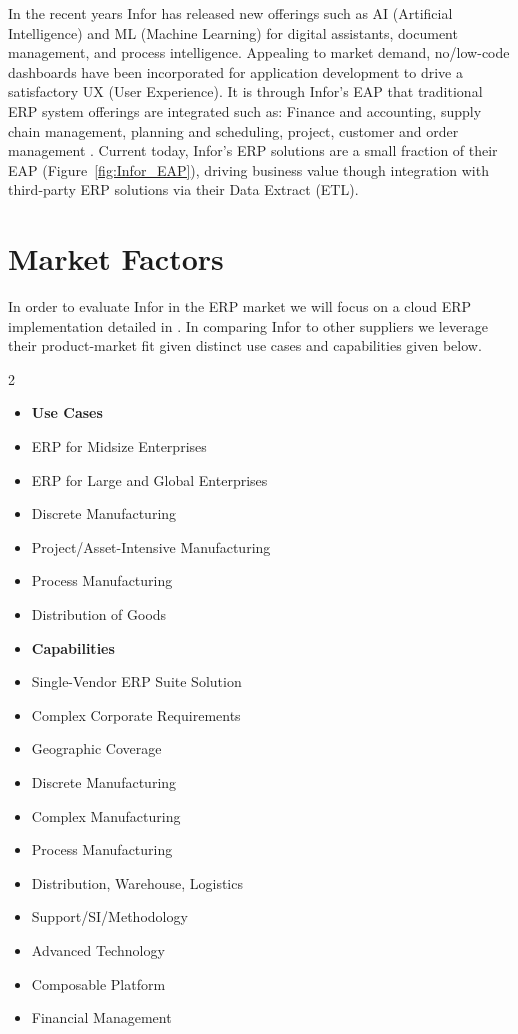 \documentclass{article}
\begin{document}
In the recent years Infor has released new offerings such as AI (Artificial Intelligence) and ML (Machine Learning) for digital assistants, document management, and process intelligence.
Appealing to market demand, no/low-code dashboards have been incorporated for application development to drive a satisfactory UX (User Experience).
It is through Infor's EAP that traditional ERP system offerings are integrated such as: Finance and accounting, supply chain management, planning and scheduling, project, customer and order management \cite{infor_erp, infor_eai_ml_os}.
Current today, Infor's ERP solutions are a small fraction of their EAP (Figure~\ref{fig:Infor_EAP}), driving business value though integration with third-party ERP solutions via their Data Extract (ETL).

\section{Market Factors}
In order to evaluate Infor in the ERP market we will focus on a cloud ERP implementation detailed in \cite{critical_cloud_erp}.
In comparing Infor to other suppliers we leverage their product-market fit given distinct use cases and capabilities given below.

\begin{multicols}{2}
\begin{itemize}
    \item[] \textbf{Use Cases}
    \item[$\diamond$] ERP for Midsize Enterprises
    \item[$\diamond$] ERP for Large and Global Enterprises
    \item[$\diamond$] Discrete Manufacturing
    \item[$\diamond$] Project/Asset-Intensive Manufacturing
    \item[$\diamond$] Process Manufacturing
    \item[$\diamond$] Distribution of Goods
\end{itemize}

\begin{itemize}
    \item[] \textbf{Capabilities}
    \item[$\ast$] Single-Vendor ERP Suite Solution
    \item[$\ast$] Complex Corporate Requirements
    \item[$\ast$] Geographic Coverage
    \item[$\ast$] Discrete Manufacturing
    \item[$\ast$] Complex Manufacturing
    \item[$\ast$] Process Manufacturing
    \item[$\ast$] Distribution, Warehouse, Logistics
    \item[$\ast$] Support/SI/Methodology
    \item[$\ast$] Advanced Technology
    \item[$\ast$] Composable Platform
    \item[$\ast$] Financial Management
\end{itemize}
\end{multicols}
\end{document}

